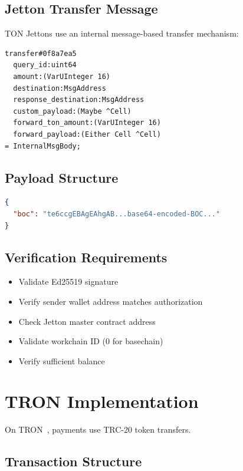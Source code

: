 \subsection{Jetton Transfer Message}

TON Jettons use an internal message-based transfer mechanism:

\begin{lstlisting}[caption={TON Jetton transfer cell structure}]
transfer#0f8a7ea5
  query_id:uint64
  amount:(VarUInteger 16)
  destination:MsgAddress
  response_destination:MsgAddress
  custom_payload:(Maybe ^Cell)
  forward_ton_amount:(VarUInteger 16)
  forward_payload:(Either Cell ^Cell)
= InternalMsgBody;
\end{lstlisting}

\subsection{Payload Structure}

\begin{lstlisting}[language=json,caption={TON exact scheme payload}]
{
  "boc": "te6ccgEBAgEAhgAB...base64-encoded-BOC..."
}
\end{lstlisting}

\subsection{Verification Requirements}

\begin{itemize}
    \item Validate Ed25519 signature
    \item Verify sender wallet address matches authorization
    \item Check Jetton master contract address
    \item Validate workchain ID (0 for basechain)
    \item Verify sufficient balance
\end{itemize}

\section{TRON Implementation}
\label{sec:tron-implementation}

On TRON~\cite{tron}, payments use TRC-20 token transfers.

\subsection{Transaction Structure}

